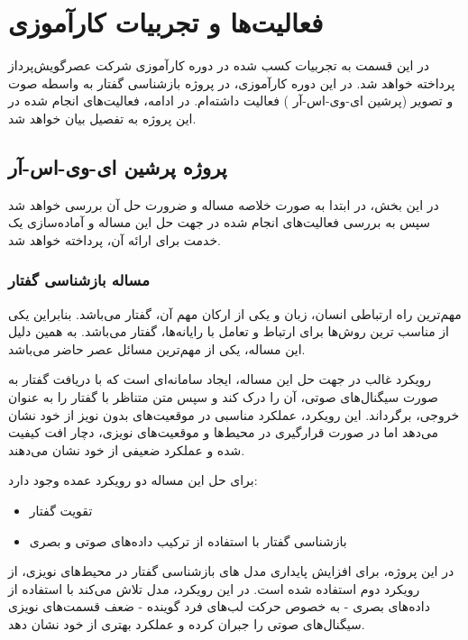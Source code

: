 \chapter{فعالیت‌ها و تجربیات کارآموزی}

در این قسمت به تجربیات کسب شده در دوره کارآموزی شرکت عصر‌گویش‌پرداز پرداخته خواهد شد. در این دوره کارآموزی، در پروژه بازشناسی گفتار به واسطه صوت و تصویر (پرشین ای-وی-اس-آر
) فعالیت داشته‌ام. در ادامه، فعالیت‌های انجام شده در این پروژه به تفصیل بیان خواهد شد.

\section{پروژه پرشین ای-وی-اس-آر}

در این بخش، در ابتدا به صورت خلاصه مساله و ضرورت حل آن بررسی خواهد شد سپس به بررسی فعالیت‌های انجام شده در جهت حل این مساله و آماده‌سازی یک خدمت
برای ارائه آن، پرداخته خواهد شد.

\subsection{مساله بازشناسی گفتار}

مهم‌ترین راه ارتباطی انسان، زبان و یکی از ارکان مهم آن، گفتار می‌باشد. بنابراین یکی از مناسب ترین روش‌ها برای ارتباط و تعامل با رایانه‌ها، گفتار می‌باشد. به همین دلیل این مساله، یکی از مهم‌ترین مسائل عصر حاضر می‌باشد. 

رویکرد غالب در جهت حل این مساله، ایجاد سامانه‌ای است که با دریافت گفتار به صورت سیگنال‌های صوتی، آن را درک کند و سپس متن متناظر با گفتار را به عنوان خروجی، برگرداند. این رویکرد، عملکرد مناسبی در موقعیت‌های بدون نویز از خود نشان می‌دهد اما در صورت قرارگیری در محیط‌ها و موقعیت‌های نویزی، دچار افت کیفیت شده و عملکرد ضعیفی از خود نشان می‌دهند.

برای حل این مساله دو رویکرد عمده وجود دارد:
\begin{itemize}
	\item تقویت گفتار
	\item بازشناسی گفتار با استفاده از ترکیب داده‌های صوتی و بصری
\end{itemize}

در این پروژه، برای افزایش پایداری
مدل های بازشناسی گفتار در محیط‌های نویزی، از رویکرد دوم استفاده شده است. در این رویکرد، مدل تلاش می‌کند با استفاده از داده‌های بصری - به خصوص حرکت لب‌های فرد گوینده - ضعف قسمت‌های نویزی سیگنال‌های صوتی را جبران کرده و عملکرد بهتری از خود نشان دهد.

